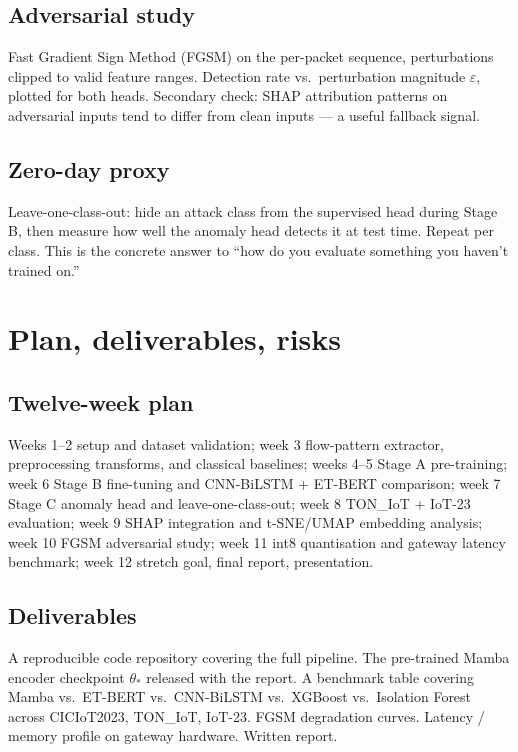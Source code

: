 \documentclass[11pt,a4paper]{article}
\begin{document}
\subsection{Adversarial study}
Fast Gradient Sign Method (FGSM) on the per-packet sequence, perturbations clipped to valid feature ranges. Detection rate vs.\ perturbation magnitude $\varepsilon$, plotted for both heads. Secondary check: SHAP attribution patterns on adversarial inputs tend to differ from clean inputs --- a useful fallback signal.

\subsection{Zero-day proxy}
Leave-one-class-out: hide an attack class from the supervised head during Stage B, then measure how well the anomaly head detects it at test time. Repeat per class. This is the concrete answer to ``how do you evaluate something you haven't trained on.''

\section{Plan, deliverables, risks}

\subsection{Twelve-week plan}
Weeks 1--2 setup and dataset validation; week 3 flow-pattern extractor, preprocessing transforms, and classical baselines; weeks 4--5 Stage A pre-training; week 6 Stage B fine-tuning and CNN-BiLSTM + ET-BERT comparison; week 7 Stage C anomaly head and leave-one-class-out; week 8 TON\_IoT + IoT-23 evaluation; week 9 SHAP integration and t-SNE/UMAP embedding analysis; week 10 FGSM adversarial study; week 11 int8 quantisation and gateway latency benchmark; week 12 stretch goal, final report, presentation.

\subsection{Deliverables}
A reproducible code repository covering the full pipeline. The pre-trained Mamba encoder checkpoint $\theta_*$ released with the report. A benchmark table covering Mamba vs.\ ET-BERT vs.\ CNN-BiLSTM vs.\ XGBoost vs.\ Isolation Forest across CICIoT2023, TON\_IoT, IoT-23. FGSM degradation curves. Latency / memory profile on gateway hardware. Written report.
\end{document}
